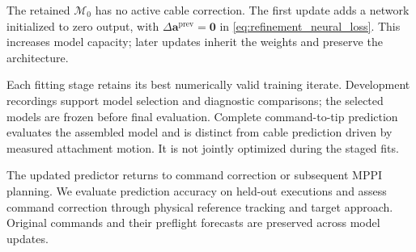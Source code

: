 \documentclass[letterpaper, 10 pt, conference]{ieeeconf}
\begin{document}
The retained $\mathcal M_0$ has no active cable correction.
The first update adds a network initialized to zero output, with
$\Delta\mathbf a^{\mathrm{prev}}=\mathbf0$ in
\eqref{eq:refinement_neural_loss}. This increases model capacity;
later updates inherit the weights and preserve the architecture.

Each fitting stage retains its best numerically valid training
iterate. Development recordings support model selection and
diagnostic comparisons; the selected models are frozen before
final evaluation. Complete command-to-tip prediction evaluates
the assembled model and is distinct from cable prediction driven
by measured attachment motion. It is not jointly optimized during
the staged fits.

The updated predictor returns to command correction or subsequent
MPPI planning. We evaluate prediction accuracy on held-out
executions and assess command correction through physical
reference tracking and target approach. Original commands and
their preflight forecasts are preserved across model updates.



\end{document}
